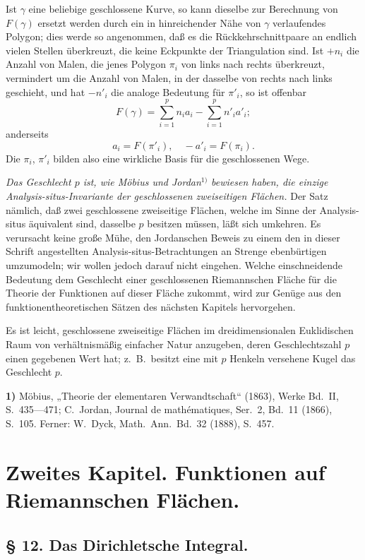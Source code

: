 \documentclass{article}
\begin{document}
Ist $\gamma$ eine beliebige geschlossene Kurve, so kann dieselbe zur Berechnung von $F(\gamma)$ ersetzt werden durch ein in hinreichender Nähe von $\gamma$ verlaufendes Polygon; dies werde so angenommen, daß es die Rückkehrschnittpaare an endlich vielen Stellen überkreuzt, die keine Eckpunkte der Triangulation sind. Ist $+ n_i$ die Anzahl von Malen, die jenes Polygon $\pi_i$ von links nach rechts überkreuzt, vermindert um die Anzahl von Malen, in der dasselbe von rechts nach links geschieht, und hat $- n'_i$ die analoge Bedeutung für $\pi'_i$, so ist offenbar
\[ F(\gamma) = \sum_{i=1}^p n_i a_i - \sum_{i=1}^p n'_i a'_i; \]
anderseits
\[ a_i = F(\pi'_i), \quad - a'_i = F(\pi_i). \]
Die $\pi_i$, $\pi'_i$ bilden also eine wirkliche Basis für die geschlossenen Wege.

\emph{Das Geschlecht $p$ ist, wie Möbius und Jordan}${}^{1)}$ \emph{bewiesen haben, die einzige Analysis-situs-Invariante der geschlossenen zweiseitigen Flächen.} Der Satz nämlich, daß zwei geschlossene zweiseitige Flächen, welche im Sinne der Analysis-situs äquivalent sind, dasselbe $p$ besitzen müssen, läßt sich umkehren. Es verursacht keine große Mühe, den Jordanschen Beweis zu einem den in dieser Schrift angestellten Analysis-situs-Betrachtungen an Strenge ebenbürtigen umzumodeln; wir wollen jedoch darauf nicht eingehen. Welche einschneidende Bedeutung dem Geschlecht einer geschlossenen Riemannschen Fläche für die Theorie der Funktionen auf dieser Fläche zukommt, wird zur Genüge aus den funktionentheoretischen Sätzen des nächsten Kapitels hervorgehen.

Es ist leicht, geschlossene zweiseitige Flächen im dreidimensionalen Euklidischen Raum von verhältnismäßig einfacher Natur anzugeben, deren Geschlechtszahl $p$ einen gegebenen Wert hat; z.~B.\ besitzt eine mit $p$ Henkeln versehene Kugel das Geschlecht $p$.

\textbf{1)} Möbius, „Theorie der elementaren Verwandtschaft“ (1863), Werke Bd.~II, S.~435---471; C.~Jordan, Journal de mathématiques, Ser.~2, Bd.~11 (1866), S.~105. Ferner: W.~Dyck, Math.\ Ann.\ Bd.~32 (1888), S.~457.

\section*{Zweites Kapitel. Funktionen auf Riemannschen Flächen.}

\subsection*{§ 12. Das Dirichletsche Integral.}
\end{document}
